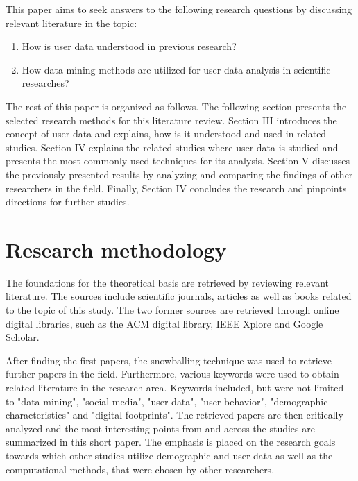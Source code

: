 \documentclass[conference]{IEEEtran}
\begin{document}
This paper aims to seek answers to the following research questions by discussing relevant literature in the topic: 

\setdefaultleftmargin{40pt}{}{}{}{}{}
\begin{enumerate}[label=RQ\arabic*:]
	\item How is user data understood in previous research?
	\item How data mining methods are utilized for user data analysis in scientific researches?
\end{enumerate}

The rest of this paper is organized as follows. The following section presents the selected research methods for this literature review. Section III introduces the concept of user data and explains, how is it understood and used in related studies. Section IV explains the related studies where user data is studied and presents the most commonly used techniques for its analysis. Section V discusses the previously presented results by analyzing and comparing the findings of other researchers in the field. Finally, Section IV concludes the research and pinpoints directions for further studies. 

\section{Research methodology}
The foundations for the theoretical basis are retrieved by reviewing relevant literature. The sources include scientific journals, articles as well as books related to the topic of this study. The two former sources are retrieved through online digital libraries, such as the ACM digital library, IEEE Xplore and Google Scholar. 

After finding the first papers, the snowballing technique was used to retrieve further papers in the field. Furthermore, various keywords were used to obtain related literature in the research area. Keywords included, but were not limited to "data mining", "social media", "user data", "user behavior", "demographic characteristics" and "digital footprints". The retrieved papers are then critically analyzed and the most interesting points from and across the studies are summarized in this short paper. The emphasis is placed on the research goals towards which other studies utilize demographic and user data as well as the computational methods, that were chosen by other researchers. 
\end{document}
